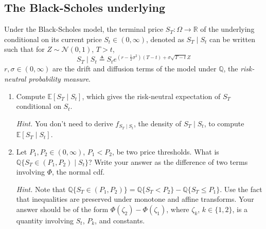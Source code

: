 \documentclass{article}
\numberwithin{equation}{section}
\begin{document}
\subsection{The Black-Scholes underlying}

Under the Black-Scholes model, the terminal price $ S_T : \Omega \rightarrow
\mathbb{R} $ of the underlying conditional on its current price $ S_t \in
(0, \infty) $, denoted as $ S_T \mid S_t $ can be written such that for
$ Z \sim \mathcal{N}(0, 1) $, $ T > t $,
\begin{equation*}
    S_T \mid S_t \triangleq S_te^{
        \left(r - \frac{1}{2}\sigma^2\right)(T - t) + \sigma\sqrt{T - t}Z
    }
\end{equation*}
$ r, \sigma \in (0, \infty) $ are the drift and diffusion terms of the
model under $ \mathbb{Q} $, the \textit{risk-neutral probability
measure}\footnotemark{}.
\begin{enumerate}[label = \alph*.]
    \item
    Compute $ \mathbb{E}[S_T \mid S_t] $, which gives the risk-neutral
    expectation of $ S_T $ conditional on $ S_t $.

    \medskip
    
    \textit{Hint.} You don't need to derive $ f_{S_T \mid S_t} $, the density
    of $ S_T \mid S_t $, to compute $ \mathbb{E}[S_T \mid  S_t] $.

    \item
    Let $ P_1, P_2 \in (0, \infty) $, $ P_1 < P_2 $, be two price thresholds.
    What is $ \mathbb{Q}\{S_T \in (P_1, P_2) \mid S_t\} $? Write your answer
    as the difference of two terms involving $ \Phi $, the normal cdf.

    \medskip

    \textit{Hint.} Note that $ \mathbb{Q}\{S_T \in (P_1, P_2)\} =
    \mathbb{Q}\{S_T < P_2\} - \mathbb{Q}\{S_T \le P_1\} $. Use the fact that
    inequalities are preserved under monotone and affine transforms. Your
    answer should be of the form $ \Phi(\zeta_2) - \Phi(\zeta_1) $, where
    $ \zeta_k $, $ k \in \{1, 2\} $, is a quantity involving $ S_t $, $ P_k $,
    and constants.
\end{enumerate}
\end{document}
